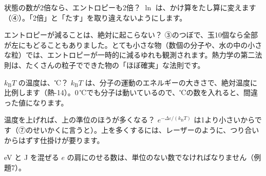 \begin{tsumazuki}{状態の数が2倍なら、エントロピーも2倍？}
$\ln$ は、かけ算をたし算に変えます（④）。「2倍」と「たす」を取り違えないようにします。
\end{tsumazuki}

\begin{tsumazuki}{エントロピーが減ることは、絶対に起こらない？}
③のつぼで、玉10個なら全部が左にもどることもありました。とても小さな物（数個の分子や、水の中の小さな粒）では、エントロピーが一時的に減るゆれも観測されます。熱力学の第二法則は、たくさんの粒子でできた物の「ほぼ確実」な法則です。
\end{tsumazuki}

\begin{tsumazuki}{$k_{\mathrm B}T$ の温度は、℃？}
$k_{\mathrm B}T$ は、分子の運動のエネルギーの大きさで、絶対温度に比例します（熱-14）。0\,℃でも分子は動いているので、℃の数を入れると、間違った値になります。
\end{tsumazuki}

\begin{tsumazuki}{温度を上げれば、上の準位のほうが多くなる？}
$e^{-\Delta\varepsilon/(k_{\mathrm B}T)}$ は1より小さいからです（⑦のせいかくに言うと）。上を多くするには、レーザーのように、つり合いからはずす仕掛けが要ります。
\end{tsumazuki}

\begin{tsumazuki}{eV と J を混ぜる}
$e$ の肩にのせる数は、単位のない数でなければなりません（例題7）。
\end{tsumazuki}

